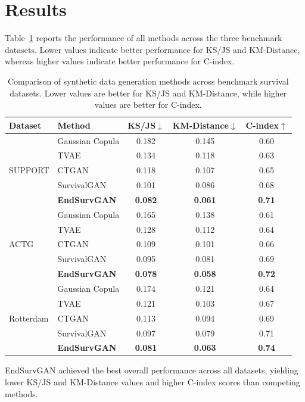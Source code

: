 \documentclass[twoside]{article}
\begin{document}
\section{Results}
Table~\ref{tab:main_results} reports the performance of all methods across the three benchmark datasets. Lower values indicate better performance for KS/JS and KM-Distance, whereas higher values indicate better performance for C-index.
\begin{table}[t]
	\centering
	\caption{Comparison of synthetic data generation methods across benchmark survival datasets. Lower values are better for KS/JS and KM-Distance, while higher values are better for C-index.}
	\label{tab:main_results}
	\small
	\begin{tabular}{llccc}
		\hline
		Dataset & Method & KS/JS$\downarrow$ & KM-Distance$\downarrow$ & C-index$\uparrow$ \\
		\hline	
		\multirow{5}{*}{SUPPORT}
		& Gaussian Copula & 0.182 & 0.145 & 0.60 \\
		& TVAE            & 0.134 & 0.118 & 0.63 \\
		& CTGAN           & 0.118 & 0.107 & 0.65 \\
		& SurvivalGAN     & 0.101 & 0.086 & 0.68 \\
		& \textbf{EndSurvGAN} & \textbf{0.082} & \textbf{0.061} & \textbf{0.71} \\
		\hline
		\multirow{5}{*}{ACTG}
		& Gaussian Copula & 0.165 & 0.138 & 0.61 \\
		& TVAE            & 0.128 & 0.112 & 0.64 \\
		& CTGAN           & 0.109 & 0.101 & 0.66 \\
		& SurvivalGAN     & 0.095 & 0.081 & 0.69 \\
		& \textbf{EndSurvGAN} & \textbf{0.078} & \textbf{0.058} & \textbf{0.72} \\
		\hline
		\multirow{5}{*}{Rotterdam}
		& Gaussian Copula & 0.174 & 0.121 & 0.64 \\
		& TVAE            & 0.121 & 0.103 & 0.67 \\
		& CTGAN           & 0.113 & 0.094 & 0.69 \\
		& SurvivalGAN     & 0.097 & 0.079 & 0.71 \\
		& \textbf{EndSurvGAN} & \textbf{0.081} & \textbf{0.063} & \textbf{0.74} \\
		\hline
	\end{tabular}
\end{table}
EndSurvGAN achieved the best overall performance across all datasets, yielding lower KS/JS and KM-Distance values and higher C-index scores than competing methods.
\end{document}
